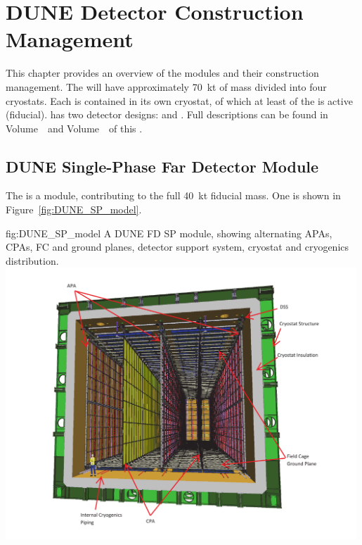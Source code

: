\chapter{DUNE Detector Construction Management}
\label{vl:tc-dune_overview}


This chapter provides an overview of
the   modules and their construction
management. The  will have approximately \SI{70}{kt} of    mass divided into four cryostats. Each  is contained in
its own   \larmass{} cryostat, of which at least \nominalmodsize of the  is active (fiducial).  has two detector designs:
 and .  Full descriptions can be found in
 Volume~\volnumbersp\ and Volume~\volnumberdp\
of this  .

\section{DUNE Single-Phase Far Detector Module}
\label{sec:fdsp-SP-module}

The   is a \nominalmodsize module,
contributing to the full \SI{40}{\kilo\tonne}  fiducial
mass.  One \nominalmodsize \dword{spmod} is shown in
Figure~\ref{fig:DUNE_SP_model}.
\begin{dunefigure}
{fig:DUNE_SP_model} 
{A \nominalmodsize DUNE FD SP module, showing alternating APAs,
    CPAs, FC and ground planes, detector support system, cryostat
    and cryogenics distribution.}
  \includegraphics[width=0.99\textwidth]{graphics/DUNE_SP_model2}
\end{dunefigure} 

